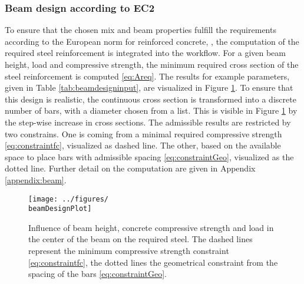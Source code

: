 \subsubsection{Beam design according to EC2}
To ensure that the chosen mix and beam properties fulfill the requirements according to the European norm for reinforced concrete, \cite{DIN1992-1-1}, the computation of the required steel reinforcement is integrated into the workflow.
For a given beam height, load and compressive strength, the minimum required cross section of the steel reinforcement is computed \eqref{eq:Areq}.
The results for example parameters, given in Table \ref{tab:beamdesigninput}, are visualized in Figure \ref{fig:beamdesign}.
To ensure that this design is realistic, the continuous cross section is transformed into a discrete number of bars, with a diameter chosen from a list.
This is visible in Figure \ref{fig:beamdesign} by the step-wise increase in cross sections.
The admissible results are restricted by two constrains.
One is coming from a minimal required compressive strength \eqref{eq:constraintfc}, visualized as dashed line.
The other, based on the available space to place bars with admissible spacing \eqref{eq:constraintGeo}, visualized as the dotted line.
Further detail on the computation are given in Appendix \ref{appendix:beam}.

\begin{figure}[ht]%
	\centering
	\texttt{[image: ../figures/\\beamDesignPlot]}
	\caption{Influence of beam height, concrete compressive strength and load in the center of the beam on the required steel. The dashed lines represent the minimum compressive strength constraint \eqref{eq:constraintfc}, the dotted lines the geometrical constraint from the spacing of the bars \eqref{eq:constraintGeo}.\label{fig:beamdesign}}
\end{figure}